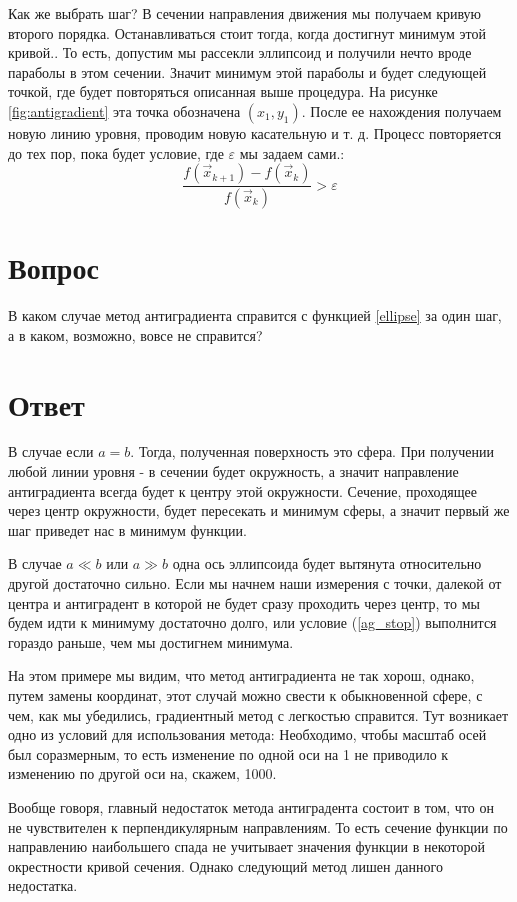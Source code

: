Как же выбрать шаг? В сечении направления движения мы получаем кривую второго порядка. Останавливаться стоит тогда, когда достигнут минимум этой кривой.. То есть, допустим мы рассекли эллипсоид и получили нечто вроде параболы в этом сечении. Значит минимум этой параболы и будет следующей точкой, где будет повторяться описанная выше процедура. На рисунке \ref{fig:antigradient} эта точка обозначена $(x_1, y_1)$. После ее нахождения получаем новую линию уровня, проводим новую касательную и т. д. Процесс повторяется до тех пор, пока будет условие, где $\varepsilon$ мы задаем сами.:
\begin{equation}
    \frac{f(\vec x_{k+1}) - f(\vec x_k)}{f(\vec x_k)} > \varepsilon
    \label{ag_stop}
\end{equation}
 
\section*{Вопрос}
В каком случае метод антиградиента справится с функцией \ref{ellipse} за один шаг, а в каком, возможно, вовсе не справится?
\section*{Ответ}
В случае если $a=b$. Тогда, полученная поверхность это сфера. При получении любой линии уровня - в сечении будет окружность, а значит направление антиградиента всегда будет к центру этой окружности. Сечение, проходящее через центр окружности, будет пересекать и минимум сферы, а значит первый же шаг приведет нас в минимум функции.

В случае $a\ll b$ или $a \gg b$ одна ось эллипсоида будет вытянута относительно другой достаточно сильно. Если мы начнем наши измерения с точки, далекой от центра и антиградент в которой не будет сразу проходить через центр, то мы будем идти к минимуму достаточно долго, или условие (\ref{ag_stop}) выполнится гораздо раньше, чем мы достигнем минимума.

На этом примере мы видим, что метод антиградиента не так хорош, однако, путем замены координат, этот случай можно свести к обыкновенной сфере, с чем, как мы убедились, градиентный метод с легкостью справится. Тут возникает одно из условий для использования метода: Необходимо, чтобы масштаб осей был соразмерным, то есть изменение по одной оси на 1 не приводило к изменению по другой оси на, скажем, 1000. 

Вообще говоря, главный недостаток метода антиградента состоит в том, что он не чувствителен к перпендикулярным направлениям. То есть сечение функции по направлению наибольшего спада не учитывает значения функции в некоторой окрестности кривой сечения. Однако следующий метод лишен данного недостатка.





